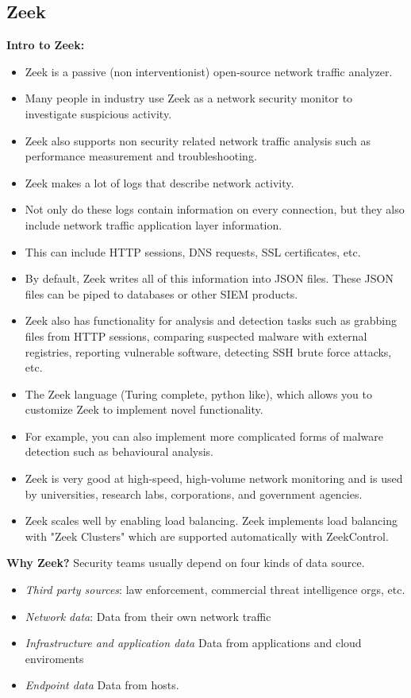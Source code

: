 \documentclass{article}
\begin{document}
\subsection{Zeek}
\textbf{Intro to Zeek:}
\begin{itemize}
    \item Zeek is a passive (non interventionist) open-source network traffic analyzer.
    \item Many people in industry use Zeek as a network security monitor to investigate suspicious activity.
    \item Zeek also supports non security related network traffic analysis such as performance measurement and troubleshooting.
    \item Zeek makes a lot of logs that describe network activity.
    \item Not only do these logs contain information on every connection, but they also include network traffic application layer information.
    \item This can include HTTP sessions, DNS requests, SSL certificates, etc.
    \item By default, Zeek writes all of this information into JSON files. These JSON files can be piped to databases or other SIEM products.
    \item Zeek also has functionality for analysis and detection tasks such as grabbing files from HTTP sessions, comparing suspected malware with external registries, reporting vulnerable software, detecting SSH brute force attacks, etc.
    \item The Zeek language (Turing complete, python like), which allows you to customize Zeek to implement novel functionality.
    \item For example, you can also implement more complicated forms of malware detection such as behavioural analysis.
    \item Zeek is very good at high-speed, high-volume network monitoring and is used by universities, research labs, corporations, and government agencies.
    \item Zeek scales well by enabling load balancing. Zeek implements load balancing with "Zeek Clusters" which are supported automatically with ZeekControl. 
\end{itemize}
\textbf{Why Zeek?}
Security teams usually depend on four kinds of data source.
\begin{itemize}
    \item \textit{Third party sources}: law enforcement, commercial threat intelligence orgs, etc.
    \item \textit{Network data}: Data from their own network traffic
    \item \textit{Infrastructure and application data} Data from applications and cloud enviroments
    \item \textit{Endpoint data} Data from hosts.
\end{itemize}
\end{document}
